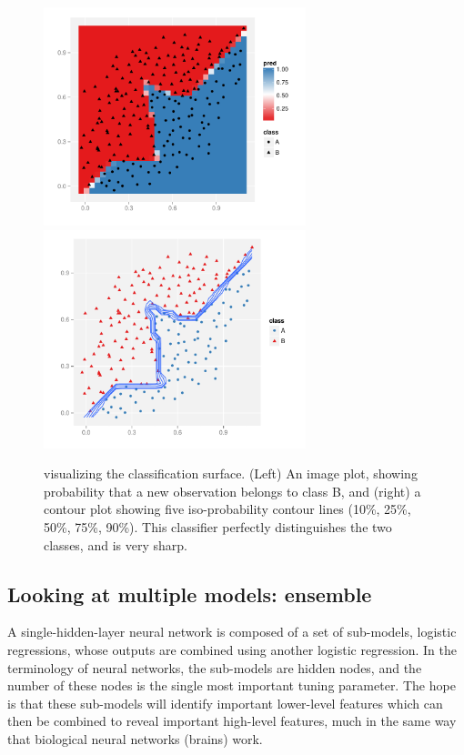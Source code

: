 \documentclass[preprint]{imsart}
\begin{document}
\begin{figure}[htbp]
  \centering
    \includegraphics[height=2.5in]{nnet-best-fill}
    \includegraphics[height=2.5in]{nnet-best-contour}
  \caption{visualizing the classification surface.  (Left) An image plot, showing probability that a new observation belongs to class B, and (right) a contour plot showing five iso-probability contour lines (10\%, 25\%, 50\%, 75\%, 90\%).  This classifier perfectly distinguishes the two classes, and is very sharp.}
  \label{fig:nnet-best}
\end{figure}

\subsection{Looking at multiple models: ensemble}
\label{sub:ensemble}

A single-hidden-layer neural network is composed of a set of sub-models, logistic regressions, whose outputs are combined using another logistic regression.  In the terminology of neural networks, the sub-models are hidden nodes, and the number of these nodes is the single most important tuning parameter.  The hope is that these sub-models will identify important lower-level features which can then be combined to reveal important high-level features, much in the same way that biological neural networks (brains) work.
\end{document}
